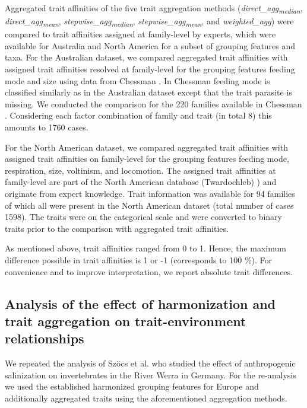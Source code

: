 \documentclass{article}
\begin{document}
Aggregated trait affinities of the five trait aggregation methods (\textit{direct\_agg\textsubscript{median}}, \textit{direct\_agg\textsubscript{mean}}, \textit{stepwise\_agg\textsubscript{median}}, \textit{stepwise\_agg\textsubscript{mean}}, and \textit{weighted\_agg}) were compared to trait affinities assigned at family-level by experts, which were available for Australia and North America for a subset of grouping features and taxa. For the Australian dataset, we compared aggregated trait affinities with assigned trait affinities resolved at family-level for the grouping features feeding mode and size using data from Chessman \cite{chessman_dissolved-oxygen_2018}. In Chessman \cite{chessman_dissolved-oxygen_2018} feeding mode is classified similarly as in the Australian dataset except that the trait parasite is missing. We conducted the comparison for the 220 families available in Chessman \cite{chessman_dissolved-oxygen_2018}. Considering each factor combination of family and trait (in total 8) this amounts to 1760 cases.

For the North American dataset, we compared aggregated trait affinities with assigned trait affinities on family-level for the grouping features feeding mode, respiration, size, voltinism, and locomotion. The assigned trait affinities at family-level are part of the North American database (Twardochleb) \cite{twardochleb_trait_data_2020}) and originate from expert knowledge. Trait information was available for 94 families of which all were present in the North American dataset (total number of cases 1598). The traits were on the categorical scale and were converted to binary traits prior to the comparison with aggregated trait affinities.

As mentioned above, trait affinities ranged from 0 to 1. Hence, the maximum difference possible in trait affinities is 1 or -1 (corresponds to 100 \%). For convenience and to improve interpretation, we report absolute trait differences.


\subsection*{Analysis of the effect of harmonization and trait aggregation on trait-environment relationships}

We repeated the analysis of Szöcs et al. \cite{szocs_effects_2014} who studied the effect of anthropogenic salinization on invertebrates in the River Werra in Germany. For the re-analysis we used the established harmonized grouping features for Europe and additionally aggregated traits using the aforementioned aggregation methods. 
\end{document}
